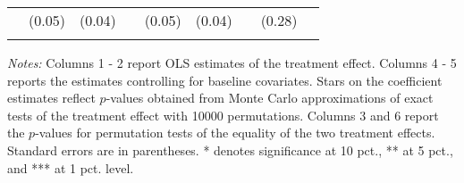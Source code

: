 \begin{table}[htbp]
{\begin{threeparttable}
\begin{tabular}{l*{8}{c}}
          &   (0.05)&   (0.04)&         &   (0.05)&   (0.04)&         &   (0.28)&         \\
          &         &         &         &         &         &         &         &         \\
\bottomrule \end{tabular} \begin{tablenotes}[flushleft] \footnotesize \item \emph{Notes:} Columns 1 - 2 report OLS estimates of the treatment effect. Columns 4 - 5 reports the estimates controlling for baseline covariates. Stars on the coefficient estimates reflect \(p\)-values obtained from Monte Carlo approximations of exact tests of the treatment effect with 10000 permutations. Columns 3 and 6 report the \(p\)-values for permutation tests of the equality of the two treatment effects. Standard errors are in parentheses. * denotes significance at 10 pct., ** at 5 pct., and *** at 1 pct. level. \end{tablenotes} \end{threeparttable} } \end{table}

